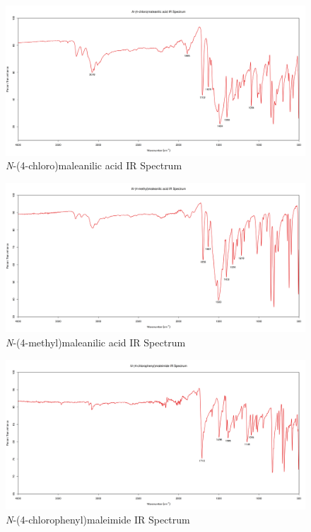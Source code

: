 \documentclass[11pt]{article}
\begin{document}
\begin{figure}[H]
    \centering
    \includegraphics[scale=0.33]{spectra/ir9.1.png}
    \caption{\textit{N}-(4-chloro)maleanilic acid IR Spectrum}
\end{figure}
\begin{figure}[H]
    \centering
    \includegraphics[scale=0.33]{spectra/ir10.1.png}
    \caption{\textit{N}-(4-methyl)maleanilic acid IR Spectrum}
\end{figure}
\begin{figure}[H]
    \centering
    \includegraphics[scale=0.33]{spectra/ir9.2.png}
    \caption{\textit{N}-(4-chlorophenyl)maleimide IR Spectrum}
\end{figure}
\end{document}
